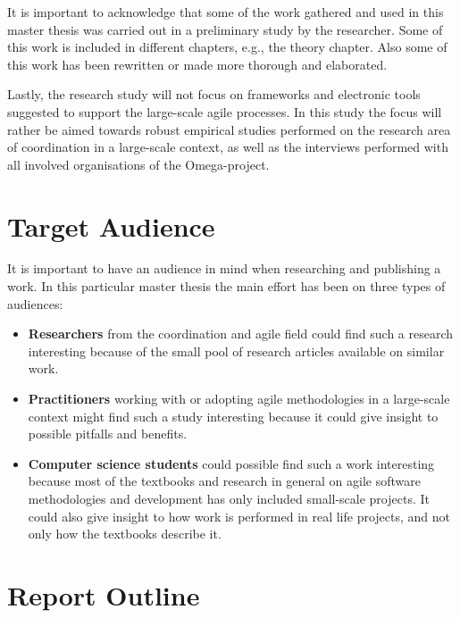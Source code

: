 It is important to acknowledge that some of the work gathered and used in this master thesis was carried out in a preliminary study by the researcher. Some of this work is included in different chapters, e.g., the theory chapter. Also some of this work has been rewritten or made more thorough and elaborated.

Lastly, the research study will not focus on frameworks and electronic tools suggested to support the large-scale agile processes. In this study the focus will rather be aimed towards robust empirical studies performed on the research area of coordination in a large-scale context, as well as the interviews performed with all involved organisations of the Omega-project.

\section{Target Audience}

It is important to have an audience in mind when researching and publishing a work. In this particular master thesis the main effort has been on three types of audiences:

\begin{itemize}
   \item \textbf{Researchers} from the coordination and agile field could find such a research interesting because of the small pool of research articles available on similar work.
   \item \textbf{Practitioners} working with or adopting agile methodologies in a large-scale context might find such a study interesting because it could give insight to possible pitfalls and benefits.
   \item \textbf{Computer science students} could possible find such a work interesting because most of the textbooks and research in general on agile software methodologies and development has only included small-scale projects. It could also give insight to how work is performed in real life projects, and not only how the textbooks describe it.
\end{itemize}


\section{Report Outline}

